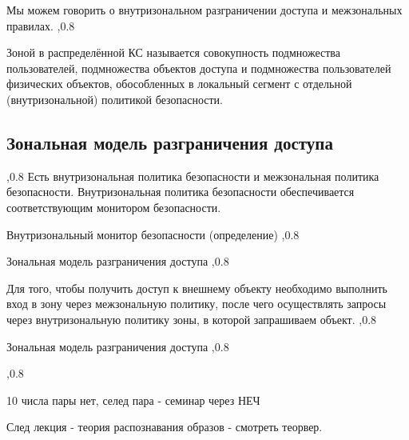 \documentclass[a4paper,12pt]{report}
\begin{document}
	Мы можем говорить о внутризональном разграничении доступа и межзональных правилах.
	,0.8

	 Зоной в распределённой КС называется совокупность подмножества пользователей, подмножества объектов доступа и подмножества пользователей физических объектов, обособленных в локальный сегмент с отдельной (внутризональной) политикой безопасности.

	\subsection{Зональная модель разграничения доступа}
	,0.8
	Есть внутризональная политика безопасности и межзональная политика безопасности. Внутризональная политика безопасности обеспечивается соответствующим монитором безопасности.
	
	Внутризональный монитор безопасности (определение)
	,0.8

	Зональная модель разграничения доступа
	,0.8

	Для того, чтобы получить доступ к внешнему объекту необходимо выполнить вход в зону через межзональную политику, после чего осуществлять запросы через внутризональную политику зоны, в которой запрашиваем объект.
	,0.8

	Зональная модель разграничения доступа
	,0.8

	,0.8

	10 числа пары нет, селед пара - семинар через НЕЧ

	След лекция - теория распознавания образов - смотреть теорвер.
\end{document}
